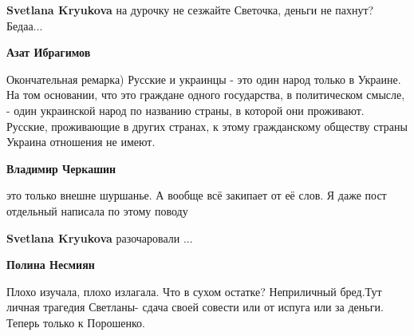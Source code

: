 \begin{itemize}
\begin{itemize}
 
\textbf{Svetlana Kryukova} на дурочку не сезжайте Светочка, деньги не пахнут? Бедаа...

 
\textbf{Азат Ибрагимов} 

Окончательная ремарка) Русские и украинцы - это один народ только в Украине. На
том основании, что это граждане одного государства, в политическом смысле, -
один украинской народ по названию страны, в которой они проживают. Русские,
проживающие в других странах, к этому гражданскому обществу страны Украина
отношения не имеют.

 
\textbf{Владимир Черкашин}

это только внешне шуршанье. А вообще всё закипает от её слов. Я даже пост
отдельный написала по этому поводу


 
\textbf{Svetlana Kryukova} разочаровали ...

 
\textbf{Полина Несмиян} 

Плохо изучала, плохо излагала. Что в сухом остатке? Неприличный бред.Тут личная
трагедия Светланы- сдача своей совести или от испуга или за деньги. Теперь
только к Порошенко.


\end{itemize}
\end{itemize}
